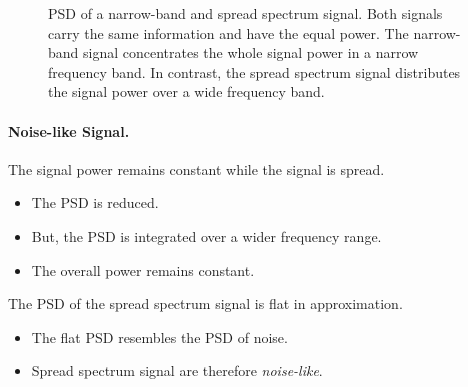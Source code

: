 \begin{refsection}
\begin{figure}[H]
	\centering
	\caption[PSD of a narrow-band and spread spectrum signal]{\acs{PSD} of a narrow-band and spread spectrum signal. Both signals carry the same information and have the equal power. The narrow-band signal concentrates the whole signal power in a narrow frequency band. In contrast, the spread spectrum signal distributes the signal power over a wide frequency band.}
\end{figure}

\paragraph{Noise-like Signal.}

The signal power remains constant while the signal is spread.
\begin{itemize}
	\item The \ac{PSD} is reduced.
	\item But, the \ac{PSD} is integrated over a wider frequency range.
	\item The overall power remains constant.
\end{itemize}

The \ac{PSD} of the spread spectrum signal is flat in approximation.
\begin{itemize}
	\item The flat \ac{PSD} resembles the \ac{PSD} of noise.
	\item Spread spectrum signal are therefore \emph{noise-like}.
\end{itemize}


\end{refsection}
